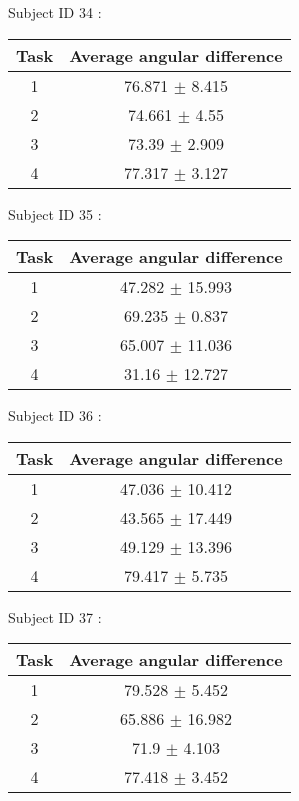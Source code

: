 \documentclass[12pt]{article}
\begin{document}
\par Subject ID  34 :
\begin{center}
\begin{tabular}{|c|c|}
\hline
 Task & Average angular difference \\ \hline
1  &  76.871 $\pm$ 8.415 \\
2  &  74.661 $\pm$ 4.55 \\
3  &  73.39 $\pm$ 2.909 \\
4  &  77.317 $\pm$ 3.127 \\
\hline
\end{tabular}
\end{center}

\par Subject ID  35 :
\begin{center}
\begin{tabular}{|c|c|}
\hline
 Task & Average angular difference \\ \hline
1  &  47.282 $\pm$ 15.993 \\
2  &  69.235 $\pm$ 0.837 \\
3  &  65.007 $\pm$ 11.036 \\
4  &  31.16 $\pm$ 12.727 \\
\hline
\end{tabular}
\end{center}

\par Subject ID  36 :
\begin{center}
\begin{tabular}{|c|c|}
\hline
 Task & Average angular difference \\ \hline
1  &  47.036 $\pm$ 10.412 \\
2  &  43.565 $\pm$ 17.449 \\
3  &  49.129 $\pm$ 13.396 \\
4  &  79.417 $\pm$ 5.735 \\
\hline
\end{tabular}
\end{center}

\par Subject ID  37 :
\begin{center}
\begin{tabular}{|c|c|}
\hline
 Task & Average angular difference \\ \hline
1  &  79.528 $\pm$ 5.452 \\
2  &  65.886 $\pm$ 16.982 \\
3  &  71.9 $\pm$ 4.103 \\
4  &  77.418 $\pm$ 3.452 \\
\hline
\end{tabular}
\end{center}
\end{document}
